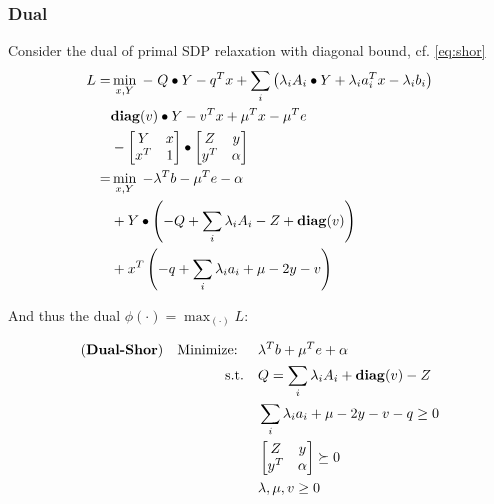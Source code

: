 \documentclass[../main]{subfiles}
\begin{document}
\subsubsection{Dual}
Consider the dual of primal SDP relaxation with diagonal bound, cf. \eqref{eq:shor}
\begin{equation}
  \begin{aligned}
    L = & \min_{x, Y} \; -\; Q\bullet Y - q^Tx + \sum_i \left( \lambda_i A_i \bullet Y  + \lambda_i a_i^Tx - \lambda_i b_i \right ) \\
        & \mathbf{diag}(v) \bullet Y - v^T x + \mu^Tx - \mu^Te                                                                              \\
        & - \begin{bmatrix}Y & x \\ x^T & 1\end{bmatrix} \bullet
    \begin{bmatrix}Z & y \\ y^T & \alpha\end{bmatrix}                                                                                                      \\
    =   & \min_{x, Y} \; - \lambda^T b - \mu^Te - \alpha                                                                            \\
        & + Y \bullet \left(-Q + \sum_i\lambda_iA_i - Z + \mathbf{diag}(v)\right)                                                           \\
        & + x^T\left(- q + \sum_i \lambda_i a_i + \mu - 2 y - v\right)
  \end{aligned}
\end{equation}

And thus the dual \(\phi(\cdot) = \max_{(\cdot)} L\):

\begin{equation}
  \begin{aligned}
    (\textbf{Dual-Shor}) \quad \textrm{Minimize: }\quad & \lambda^Tb + \mu^Te + \alpha                   \\
    \mathrm{s.t.} \quad                              & Q = \sum_i \lambda_i A_i  + \mathbf{diag}(v)  -Z       \\
                                                     & \sum_i \lambda_i a_i + \mu - 2 y - v - q \ge 0 \\
                                                     & \begin{bmatrix}Z & y \\ y^T & \alpha\end{bmatrix} \succeq 0           \\
                                                     & \lambda, \mu, v \ge 0
  \end{aligned}
\end{equation}
\end{document}
